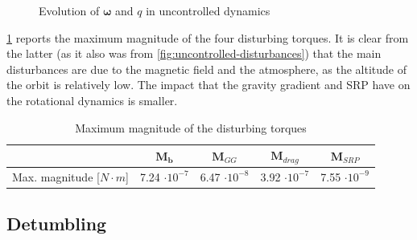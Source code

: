 \begin{figure}[h!]
    \centering
    \caption{Evolution of $\bm{\omega}$ and $q$ in uncontrolled dynamics}
    \label{fig:uncontrolled-wq}
\end{figure}

\cref{tab:magnitude_torques} reports the maximum magnitude of the four disturbing torques. It is clear from the latter (as it also was from \cref{fig:uncontrolled-disturbances}) that the main disturbances are due to the magnetic field and the atmosphere, as the altitude of the orbit is relatively low. The impact that the gravity gradient and SRP have on the rotational dynamics is smaller.


\begin{table}[h!]
    \centering
    \caption{Maximum magnitude of the disturbing torques}
    \begin{tabular}{ccccc}
    \toprule
    \toprule
    & $\mathbf{M}_{\mathbf{b}}$ & $\mathbf{M}_{GG}$ & $\mathbf{M}_{drag}$ & $\mathbf{M}_{SRP}$\\
    \midrule
    Max. magnitude [$N\cdot m$] & 7.24 $\cdot 10^{-7}$ & 6.47 $\cdot 10^{-8}$ & 3.92 $\cdot 10^{-7}$ & 7.55 $\cdot 10^{-9}$ \\
    \bottomrule
    \bottomrule
    \end{tabular}
    \label{tab:magnitude_torques}
\end{table}

\subsection{Detumbling} \label{sec:control-tracking}


